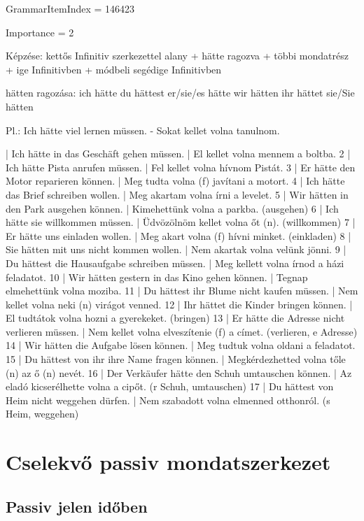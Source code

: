 \documentclass{article}
\newenvironment{desc}{\verbatim}{\endverbatim}
\newenvironment{exmp}{\verbatim}{\endverbatim}
\begin{document}
GrammarItemIndex = 146423

Importance = 2

\begin{desc}
Képzése: kettős Infinitiv szerkezettel
alany + hätte ragozva + többi mondatrész + ige Infinitivben + módbeli segédige Infinitivben

hätten ragozása:
ich hätte
du hättest
er/sie/es hätte
wir hätten
ihr hättet
sie/Sie hätten

Pl.: Ich hätte viel lernen müssen. - Sokat kellet volna tanulnom.
\end{desc}

\begin{exmp}
1 | Ich hätte in das Geschäft gehen müssen. | El kellet volna mennem a boltba.
2 | Ich hätte Pista anrufen müssen. | Fel kellet volna hívnom Pistát.
3 | Er hätte den Motor reparieren können. | Meg tudta volna (f) javítani a motort.
4 | Ich hätte das Brief schreiben wollen. | Meg akartam volna írni a levelet.
5 | Wir hätten in den Park ausgehen können. | Kimehettünk volna a parkba. (ausgehen)
6 | Ich hätte sie willkommen müssen. | Üdvözölnöm kellet volna őt (n). (willkommen)
7 | Er hätte uns einladen wollen. | Meg akart volna (f) hívni minket. (einkladen)
8 | Sie hätten mit uns nicht kommen wollen. | Nem akartak volna velünk jönni.
9 | Du hättest die Hausaufgabe schreiben müssen. | Meg kellett volna írnod a házi feladatot.
10 | Wir hätten gestern in das Kino gehen können. | Tegnap elmehettünk volna moziba.
11 | Du hättest ihr Blume nicht kaufen müssen. | Nem kellet volna neki (n) virágot venned.
12 | Ihr hättet die Kinder bringen können. | El tudtátok volna hozni a gyerekeket. (bringen)
13 | Er hätte die Adresse nicht verlieren müssen. | Nem kellet volna elveszítenie (f) a címet. (verlieren, e Adresse)
14 | Wir hätten die Aufgabe lösen können. | Meg tudtuk volna oldani a feladatot.
15 | Du hättest von ihr ihre Name fragen können. | Megkérdezhetted volna tőle (n) az ő (n) nevét.
16 | Der Verkäufer hätte den Schuh umtauschen können. | Az eladó kicserélhette volna a cipőt. (r Schuh, umtauschen)
17 | Du hättest von Heim nicht weggehen dürfen. | Nem szabadott volna elmenned otthonról. (s Heim, weggehen)
\end{exmp}

\section{Cselekvő passiv mondatszerkezet}

\subsection{Passiv jelen időben}
\end{document}
